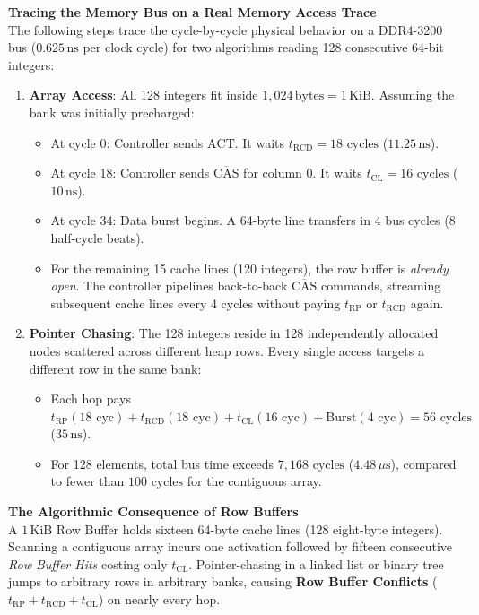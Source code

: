\begin{walkbox}
\textbf{Tracing the Memory Bus on a Real Memory Access Trace}\\
The following steps trace the cycle-by-cycle physical behavior on a DDR4-3200 bus ($0.625\,\text{ns}$ per clock cycle) for two algorithms reading 128 consecutive 64-bit integers:
\begin{enumerate}[itemsep=0pt]
    \item \textbf{Array Access}: All 128 integers fit inside $1{,}024\,\text{bytes} = 1\,\text{KiB}$.
    Assuming the bank was initially precharged:
    \begin{itemize}[itemsep=0pt]
        \item At cycle 0: Controller sends $\text{ACT}$. It waits $t_{\text{RCD}} = 18\text{ cycles}$ ($11.25\,\text{ns}$).
        \item At cycle 18: Controller sends $\overline{\text{CAS}}$ for column 0. It waits $t_{\text{CL}} = 16\text{ cycles}$ ($10\,\text{ns}$).
        \item At cycle 34: Data burst begins. A 64-byte line transfers in 4 bus cycles (8 half-cycle beats).
        \item For the remaining 15 cache lines (120 integers), the row buffer is \emph{already open}. The controller pipelines back-to-back $\overline{\text{CAS}}$ commands, streaming subsequent cache lines every 4 cycles without paying $t_{\text{RP}}$ or $t_{\text{RCD}}$ again.
    \end{itemize}
    \item \textbf{Pointer Chasing}: The 128 integers reside in 128 independently allocated nodes scattered across different heap rows. Every single access targets a different row in the same bank:
    \begin{itemize}[itemsep=0pt]
        \item Each hop pays $t_{\text{RP}} (18\text{ cyc}) + t_{\text{RCD}} (18\text{ cyc}) + t_{\text{CL}} (16\text{ cyc}) + \text{Burst} (4\text{ cyc}) = 56\text{ cycles}$ ($35\,\text{ns}$).
        \item For 128 elements, total bus time exceeds $7{,}168\text{ cycles}$ ($4.48\,\mu\text{s}$), compared to fewer than $100\text{ cycles}$ for the contiguous array.
    \end{itemize}
\end{enumerate}
\end{walkbox}

\begin{focusbox}
\textbf{The Algorithmic Consequence of Row Buffers}\\
A $1\,\text{KiB}$ Row Buffer holds sixteen 64-byte cache lines (128 eight-byte integers).
Scanning a contiguous array incurs one activation followed by fifteen consecutive
\emph{Row Buffer Hits} costing only $t_{\text{CL}}$.
Pointer-chasing in a linked list or binary tree jumps to arbitrary rows in arbitrary
banks, causing \textbf{Row Buffer Conflicts} ($t_{\text{RP}} + t_{\text{RCD}} + t_{\text{CL}}$)
on nearly every hop.
\end{focusbox}

